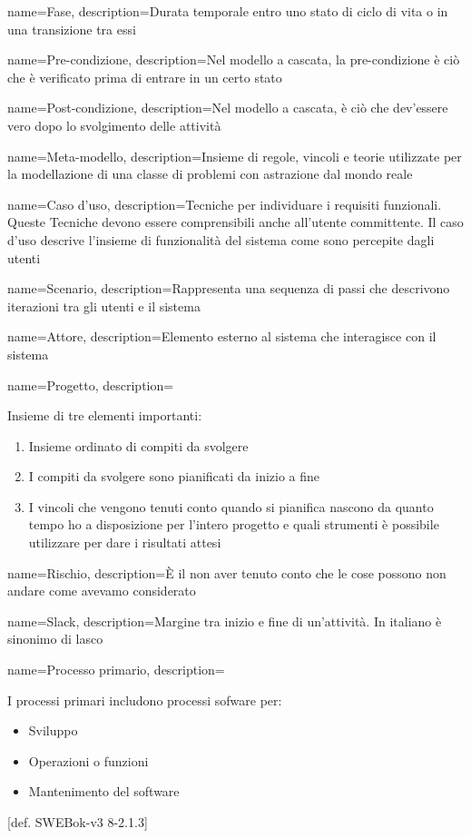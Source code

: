 {
name=Fase,
description={Durata temporale entro uno stato di ciclo di vita o in una transizione tra essi}
}


{
name=Pre-condizione,
description={Nel modello a cascata, la pre-condizione è ciò che è verificato prima di entrare in un certo stato}
}

{
name=Post-condizione,
description={Nel modello a cascata, è ciò che dev'essere vero dopo lo svolgimento delle attività}
}

{
name=Meta-modello,
description={Insieme di regole, vincoli e teorie utilizzate per la modellazione di una classe di problemi con astrazione dal mondo reale}
}

{
name=Caso d'uso,
description={Tecniche per individuare i requisiti funzionali. Queste Tecniche devono essere comprensibili anche all'utente committente. Il caso d'uso descrive l'insieme di funzionalità del sistema come sono percepite dagli utenti}
}

{
name=Scenario,
description={Rappresenta una sequenza di passi che descrivono iterazioni tra gli utenti e il sistema}
}

{
name=Attore,
description={Elemento esterno al sistema che interagisce con il sistema}
}

{
name=Progetto,
description={Insieme di tre elementi importanti: \begin{enumerate}
\item Insieme ordinato di compiti da svolgere
\item I compiti da svolgere sono pianificati da inizio a fine
\item I vincoli che vengono tenuti conto quando si pianifica nascono da quanto tempo ho a disposizione per l'intero progetto e quali strumenti \`e possibile utilizzare per dare i risultati attesi
\end{enumerate}
}
}

{
name=Rischio,
description={\`E il non aver tenuto conto che le cose possono non andare come avevamo considerato}
}

{
name=Slack,
description={Margine tra inizio e fine di un'attività. In italiano è sinonimo di lasco}
}

{
name=Processo primario,
description={I processi primari includono processi sofware per: \begin{itemize}
\item Sviluppo
\item Operazioni o funzioni
\item Mantenimento del software
\end{itemize}
[def. SWEBok-v3 8-2.1.3]}
}

